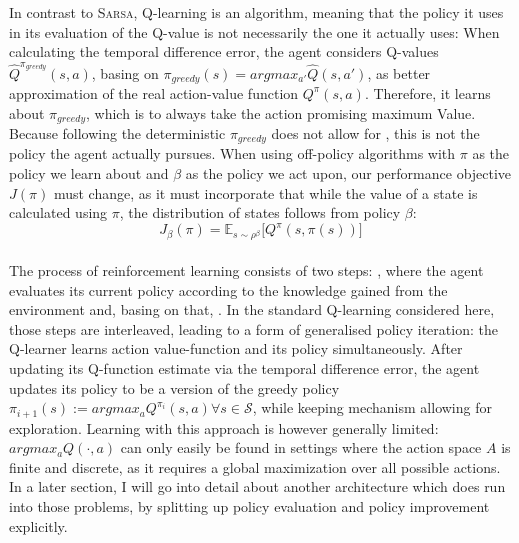 In contrast to \textsc{Sarsa}, Q-learning is an  algorithm, meaning that the policy it uses in its evaluation of the Q-value is not necessarily the one it actually uses: When calculating the temporal difference error, the agent considers Q-values $\hat{Q}^{\pi_{greedy}}(s,a)$, basing on $\pi_{greedy}(s) = argmax_{a'}\hat{Q}(s,a')$, as better approximation of the real action-value function $Q^\pi(s,a)$. Therefore, it learns about $\pi_{greedy}$, which is to always take the action promising maximum Value. Because following the deterministic $\pi_{greedy}$ does not allow for  , this is not the policy the agent actually pursues. When using off-policy algorithms with $\pi$ as the policy we learn about and $\beta$ as the policy we act upon, our performance objective $J(\pi)$ must change, as it must incorporate that while the value of a state is calculated using $\pi$, the distribution of states follows from policy $\beta$: 
\begin{equation} \label{eq:performance}
	J_\beta(\pi) = \mathds{E}_{s\sim\rho^\beta} \big[Q^\pi(s, \pi(s))]
\end{equation}\\

The process of reinforcement learning consists of two steps: , where the agent evaluates its current policy according to the knowledge gained from the environment and, basing on that, . In the standard Q-learning considered here, those steps are interleaved, leading to a form of generalised policy iteration: the Q-learner learns action value-function and its policy simultaneously. After updating its Q-function estimate via the temporal difference error, the agent updates its policy to be a  version of the greedy policy $\pi_{i+1}(s) := argmax_a Q^{\pi_i}(s,a) \forall s \in \mathcal{S}$, while keeping mechanism allowing for exploration.  Learning with this approach is however generally limited: $argmax_aQ(\cdot, a)$ can only easily be found in settings where the action space $A$ is finite and discrete, as it requires a global maximization over all possible actions. In a later section, I will go into detail about another architecture which does run into those problems, by splitting up policy evaluation and policy improvement explicitly.\\


